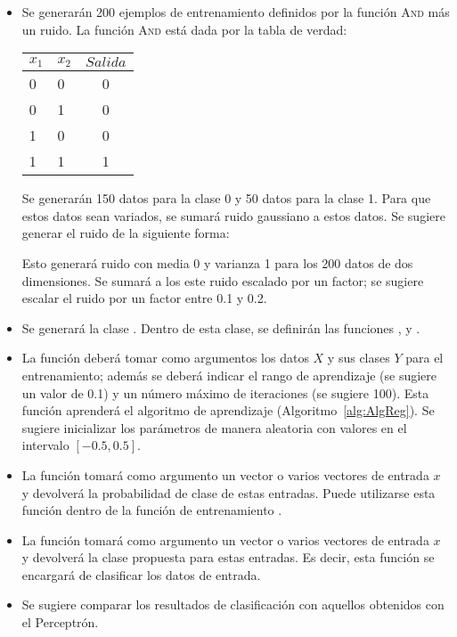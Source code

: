 \begin{itemize}
    \item Se generarán 200 ejemplos de entrenamiento definidos por la función \textsc{And} más un ruido. La función \textsc{And} está dada por la tabla de verdad:
    \begin{center}
        \begin{tabular}{ l l | c }
          $x_1$ & $x_2$ & $Salida$\\ \hline
          0 & 0  & 0 \\ \hline
          0 & 1 &  0  \\ \hline
          1 & 0 & 0  \\ \hline
          1 & 1 & 1  \\
        \end{tabular}
    \end{center}
    Se generarán 150 datos para la clase 0 y 50 datos para la clase 1. Para que estos datos sean variados, se sumará ruido gaussiano a estos datos. Se sugiere generar el ruido de la siguiente forma: 
    \begin{center}
    \end{center}
    Esto generará ruido con media 0 y varianza 1 para los 200 datos de dos dimensiones. Se sumará a los este ruido escalado por un factor; se sugiere escalar el ruido por un factor entre 0.1 y 0.2.
    \item Se generará la clase . Dentro de esta clase, se definirán las funciones ,  y .
    \item La función  deberá tomar como argumentos los datos $X$ y sus clases $Y$ para el entrenamiento; además se deberá indicar el rango de aprendizaje (se sugiere un valor de 0.1) y un número máximo de iteraciones (se sugiere 100). Esta función aprenderá el algoritmo de aprendizaje (Algoritmo~\ref{alg:AlgReg}). Se sugiere inicializar los parámetros de manera aleatoria con valores en el intervalo $[-0.5,0.5]$.
    \item La función  tomará como argumento un vector o varios vectores de entrada $x$ y devolverá la probabilidad de clase de estas entradas. Puede utilizarse esta función dentro de la función de entrenamiento .
    \item La función  tomará como argumento un vector o varios vectores de entrada $x$ y devolverá la clase propuesta para estas entradas. Es decir, esta función se encargará de clasificar los datos de entrada.
    \item Se sugiere comparar los resultados de clasificación con aquellos obtenidos con el Perceptrón. 
\end{itemize}



